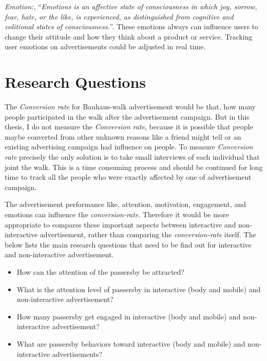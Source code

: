 \emph{Emotion:}, ``\emph{Emotions is an affective state of consciousness in which joy, sorrow, fear, hate, or the like, is experienced, as distinguished from cognitive and volitional states of consciousness.}''\cite{emotiondef}. These emotions always can influence users to change their attitude and how they think about a product or service. Tracking user emotions on advertisements could be adjusted in real time.



\section{Research Questions}
The \emph{Conversion rate} for Bauhaus-walk advertisement would be that, how many people participated in the walk after the advertisement campaign. But in this thesis, I do not measure the \emph{Conversion rate}, because it is possible that people maybe converted from other unknown reasons like a friend might tell or an existing advertising campaign had influence on people. To measure \emph{Conversion rate} precisely the only solution is to take small interviews of each individual that joint the walk. This is a time consuming process and should be continued for long time to track all the people who were exactly affected by one of advertisement campaign.

The advertisement performance like, attention, motivation, engagement, and emotions can influence the \emph{conversion-rate}. Therefore it would be more appropriate to compares these important aspects between interactive and non-interactive advertisement, rather than comparing the \emph{conversion-rate} itself. The below lists the main research questions that need to be find out for interactive and non-interactive advertisement.


\begin{itemize}
\item How can the attention of the passersby be attracted? 
\item What is the attention level of passersby in interactive (body and mobile) and non-interactive advertisement?
\item How many passersby get engaged in interactive (body and mobile) and non-interactive advertisement?
\item What are passersby behaviors toward interactive (body and mobile) and non-interactive advertisements?
\end{itemize}



